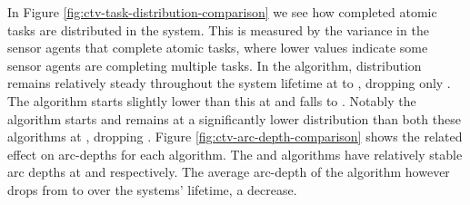 In Figure \ref{fig:ctv-task-distribution-comparison} we see how completed atomic tasks are distributed in the system. This is measured by the variance in the sensor agents that complete atomic tasks, where lower values indicate some sensor agents are completing multiple tasks. In the \algorithmDistribution{}{} algorithm, distribution remains relatively steady throughout the system lifetime at \resultsTaskDistDistStart{}{} to \resultsTaskDistDistEnd{}{}, dropping only \resultsTaskDistDistPercent{}{}. The \algorithmQuality{}{} algorithm starts slightly lower than this at \resultsTaskDistQualityStart{}{} and falls \resultsTaskDistQualityPercent{}{} to \resultsTaskDistQualityEnd{}{}. Notably the \algorithmEnergy{}{} algorithm starts and remains at a significantly lower distribution than both these algorithms at \resultsTaskDistEnergyEnd{}{}, dropping \resultsTaskDistEnergydPercent{}{}. Figure
\ref{fig:ctv-arc-depth-comparison} shows the related effect on arc-depths for each algorithm. The \algorithmQuality{}{} and \algorithmDistribution{}{} algorithms have relatively stable arc depths at \resultsArcDepthQualityEnd{}{} and \resultsArcDepthDistEnd{}{} respectively. The average arc-depth of the \algorithmEnergy{}{} algorithm however drops from \resultsArcDepthEnergyStart{}{} to  \resultsArcDepthEnergyEnd{}{} over the systems' lifetime, a \resultsArcDepthEnergyPercent{}{} decrease.


